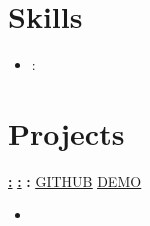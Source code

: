 \documentclass[letterpaper, 11pt]{article}
\newcommand{\bulletSpace}{\vspace{-5pt}}
\newcommand{\secStartSpace}{\vspace{3pt}}
\newcommand{\secEndSpace}{\vspace{5pt}}
\newcommand{\spaceCollapse}{\vspace{-5pt}}
\begin{document}

\section{\color{black} \textbf{Skills}}
\secStartSpace
\begin{addmargin}[0em]{1em}

\begin{itemize}[leftmargin=1.5em]
    \item \textbf{}:  \bulletSpace
\end{itemize}

\end{addmargin}
\secEndSpace

\section{\color{black} \textbf{Projects}}
\secStartSpace
\begin{addmargin}[0em]{1em}

    \noindent
    \href{\VAR{ project.demoUrl }}{\textbf{:}}
    \href{\VAR{ project.demoUrl }}{\textbf{:}}
    \textbf{:}
    \hfill
     \href{\VAR{ project.githubUrl }}{\underline{GITHUB}}
     \href{\VAR{ project.demoUrl }}{\underline{DEMO}}

    \noindent {} \spaceCollapse
    \begin{itemize}[leftmargin=1.5em]
    \item {} \bulletSpace
    \end{itemize}
\end{addmargin}

% 
%
\end{document}
